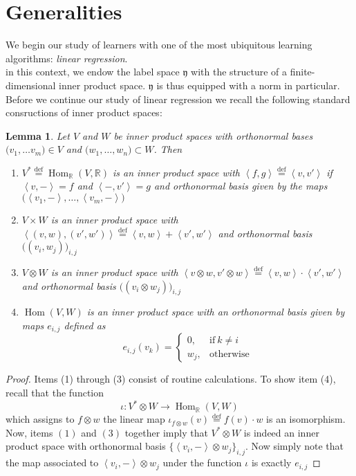 \documentclass{book}
\theoremstyle{plain}
\newtheorem{lemma}[corollary]{Lemma}
\theoremstyle{definition}
\newcommand{\bl}[2]{\left\langle #1,#2\right\rangle}
\renewcommand{\d}[1]{\mathbb{#1}}
\newcommand{\define}{\stackrel{\operatorname{def}}{=}}
\newcommand{\f}[1]{\mathfrak{#1}}
\DeclareMathOperator{\Hom}{Hom}
\newcommand{\mor}{\longrightarrow}
\newcommand{\tr}{\otimes}
\begin{document}
\section{Generalities}

We begin our study of learners with one of the most ubiquitous learning algorithms: \emph{linear regression}.\\ in this context, we endow the  label space $\f{y}$ with the structure of a finite-dimensional inner product space. $\f{y}$ is thus equipped with a norm in particular. Before we continue our study of linear regression we recall the following standard consructions of inner product spaces:

\begin{lemma}\label{lem:innerproducts}
Let $V$ and $W$ be inner product spaces with orthonormal bases $\big(v_1,\ldots v_m\big) \in V$ and $\big(w_1,\ldots , w_n\big) \subset W$. Then
\begin{enumerate}
\item $V^\ast \define \Hom_\d{R}(V,\d{R})$ is an inner product space with $\bl{f}{g}\define \bl{v}{v'}$ if $\bl{v}{-}=f$ and  $\bl{-}{v'}=g$
and orthonormal basis given by the maps $\bigg( \bl{v_1}{-}, \ldots, \bl{v_m}{-} \bigg)$
\item $V\times W$ is an inner product space with $\bl{(v,w)}{(v',w')}\define \bl{v}{w}+\bl{v'}{w'}$ and orthonormal basis $\bigg((v_i,w_j)\bigg)_{i,j}$
\item $V\tr W$ is an inner product space with $\bl{v\tr w}{v'\tr w}\define \bl{v}{w}\cdot \bl{v'}{w'}$ and orthonormal basis $\bigg((v_i\tr w_j)\bigg)_{i,j}$	
\item $\Hom(V,W)$ is an inner product space with an orthonormal basis given by maps $e_{i,j}$ defined as
\begin{equation}
e_{i,j}(v_k)=
\begin{cases}
0, & \text{if}\ k \neq i  \\
w_j, & \text{otherwise}
\end{cases}
\end{equation}
\end{enumerate}
\end{lemma}


\begin{proof}
Items (1) through (3) consist of routine calculations. To show item (4), recall that the function
\[
\iota: V^*\tr W \mor \Hom_{\d{R}}(V,W)
\]
which assigns to $f\tr w$ the linear map $\iota_{f\tr w}(v)\define f(v)\cdot w$ is an isomorphism. Now, items $(1)$ and $(3)$ together imply that $V^*\tr W$ is indeed an inner product space with  orthonormal basis $\big\{\bl{v_i}{-}\tr w_j\big\}_{i,j}$. Now simply note that the map associated to $\bl{v_i}{-}\tr w_j$ under the function $\iota$ is exactly $e_{i,j}$
\end{proof}	
	
\end{document}
